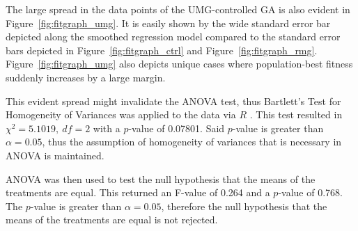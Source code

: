\documentclass{strrespaper-journ}
\begin{document}
		The large spread in the data points of the UMG-controlled GA is also evident in Figure~\ref{fig:fitgraph_umg}.
		It is easily shown by the wide standard error bar depicted along the smoothed regression model compared to the standard error bars depicted in Figure~\ref{fig:fitgraph_ctrl} and Figure~\ref{fig:fitgraph_rmg}.
		Figure~\ref{fig:fitgraph_umg} also depicts unique cases where population-best fitness suddenly increases by a large margin.

		This evident spread might invalidate the ANOVA test, thus Bartlett's Test for Homogeneity of Variances was applied to the data via $R$ \autocite{nist/sematechBartlettTest2013}.
		This test resulted in $\chi^2 = 5.1019,~df = 2$ with a $p$-value of 0.07801.
		Said $p$-value is greater than $\alpha = 0.05$, thus the assumption of homogeneity of variances that is necessary in ANOVA is maintained.

		ANOVA was then used to test the null hypothesis that the means of the treatments are equal.
		This returned an F-value of 0.264 and a $p$-value of 0.768.
		The $p$-value is greater than $\alpha = 0.05$, therefore the null hypothesis that the means of the treatments are equal is not rejected.
\end{document}
